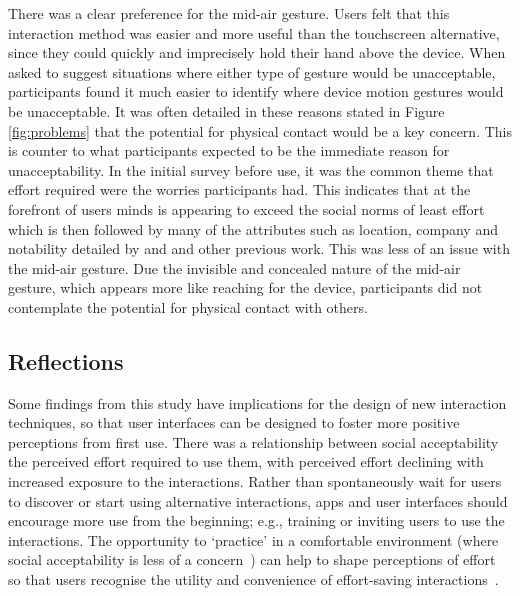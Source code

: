 \documentclass{l4proj}
\begin{document}
There was a clear preference for the mid-air gesture. Users felt that this interaction method was easier and more useful than the touchscreen alternative, since they could quickly and imprecisely hold their hand above the device. When asked to suggest situations where either type of gesture would be unacceptable, participants found it much easier to identify where device motion gestures would be unacceptable. It was often detailed in these reasons stated in Figure \ref{fig:problems} that the potential for physical contact would be a key concern. This is counter to what participants expected to be the immediate reason for unacceptability. In the initial survey before use, it was the common theme that effort required were the worries participants had. This indicates that at the forefront of users minds is appearing to exceed the social norms of least effort which is then followed by many of the attributes such as location, company and notability detailed by \citet{rico_usable_2010} and \citet{pohl_focused_2013} and other previous work. This was less of an issue with the mid-air gesture. Due the invisible and concealed nature of the mid-air gesture, which appears more like reaching for the device, participants did not contemplate the potential for physical contact with others.

\subsection{Reflections}

Some findings from this study have implications for the design of new interaction techniques, so that user interfaces can be designed to foster more positive perceptions from first use. There was a relationship between social acceptability the perceived effort required to use them, with perceived effort declining with increased exposure to the interactions. Rather than spontaneously wait for users to discover or start using alternative interactions, apps and user interfaces should encourage more use from the beginning; e.g., training or inviting users to use the interactions. The opportunity to `practice' in a comfortable environment (where social acceptability is less of a concern~\citet{rico_usable_2010}) can help to shape perceptions of effort so that users recognise the utility and convenience of  effort-saving interactions~\citet{pohl_focused_2013}.
\end{document}
